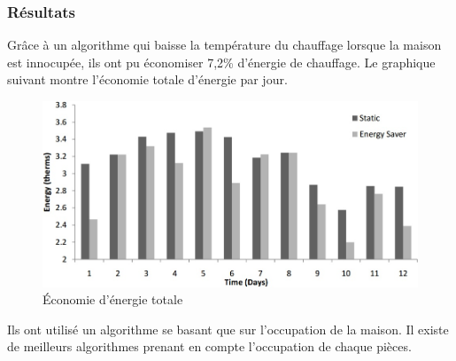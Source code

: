 \begin{frame}
 \frametitle{Résultats}
 Grâce à un algorithme qui baisse la température du chauffage lorsque la maison est innocupée, ils ont pu économiser 7,2\% d'énergie de chauffage.
 Le graphique suivant montre l'économie totale d'énergie par jour.
 \begin{figure}
  \centering
  \includegraphics[scale=0.38]{figures/energysaver.jpg}
  \caption{Économie d'énergie totale}
 \end{figure} 
 Ils ont utilisé un algorithme se basant que sur l'occupation de la maison. Il existe de meilleurs algorithmes prenant en compte l'occupation de chaque pièces.
\end{frame}

 
 